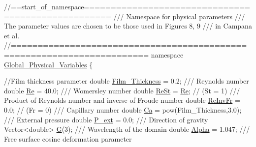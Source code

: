  
\begin{DoxyCodeInclude}
\textcolor{comment}{//==start\_of\_namespace===================================================}
\textcolor{comment}{/// Namespace for physical parameters}
\textcolor{comment}{}\textcolor{comment}{/// The parameter values are chosen to be those used in Figures 8, 9 }
\textcolor{comment}{}\textcolor{comment}{/// in Campana et al.}
\textcolor{comment}{}\textcolor{comment}{//=======================================================================}
\textcolor{keyword}{namespace }\hyperlink{namespaceGlobal__Physical__Variables}{Global\_Physical\_Variables}
\{

  \textcolor{comment}{//Film thickness parameter}
 \textcolor{keywordtype}{double} \hyperlink{namespaceGlobal__Physical__Variables_a4d1da0a125f6044733e121f0f3d958ca}{Film\_Thickness} = 0.2;
\textcolor{comment}{}
\textcolor{comment}{ /// Reynolds number}
\textcolor{comment}{} \textcolor{keywordtype}{double} \hyperlink{namespaceGlobal__Physical__Variables_ab814e627d2eb5bc50318879d19ab16b9}{Re} = 40.0;
 \textcolor{comment}{}
\textcolor{comment}{ /// Womersley number}
\textcolor{comment}{} \textcolor{keywordtype}{double} \hyperlink{namespaceGlobal__Physical__Variables_a085ee4bf968ffdd01a41b8c41864f907}{ReSt} = \hyperlink{namespaceGlobal__Physical__Variables_ab814e627d2eb5bc50318879d19ab16b9}{Re}; \textcolor{comment}{// (St = 1)}
 \textcolor{comment}{}
\textcolor{comment}{ /// Product of Reynolds number and inverse of Froude number}
\textcolor{comment}{} \textcolor{keywordtype}{double} \hyperlink{namespaceGlobal__Physical__Variables_aa6286f02b476912dd7550eced538331a}{ReInvFr} = 0.0; \textcolor{comment}{// (Fr = 0)}
\textcolor{comment}{}
\textcolor{comment}{ /// Capillary number}
\textcolor{comment}{} \textcolor{keywordtype}{double} \hyperlink{namespaceGlobal__Physical__Variables_a8b32b93d2e546f9375ec418474107838}{Ca} = pow(Film\_Thickness,3.0);
\textcolor{comment}{}
\textcolor{comment}{ /// External pressure}
\textcolor{comment}{} \textcolor{keywordtype}{double} \hyperlink{namespaceGlobal__Physical__Variables_a0406c0cbd463d1df2458fe5de98a00eb}{P\_ext} = 0.0;
\textcolor{comment}{}
\textcolor{comment}{ /// Direction of gravity}
\textcolor{comment}{} Vector<double> \hyperlink{namespaceGlobal__Physical__Variables_af5ae275cf339105b9a54821c034df470}{G}(3);
\textcolor{comment}{}
\textcolor{comment}{ /// Wavelength of the domain}
\textcolor{comment}{} \textcolor{keywordtype}{double} \hyperlink{namespaceGlobal__Physical__Variables_aa2e802ee7cc8e1ac900ba94c3ce86eb7}{Alpha} = 1.047;
 \textcolor{comment}{}
\textcolor{comment}{ /// Free surface cosine deformation parameter}

\end{DoxyCodeInclude}
